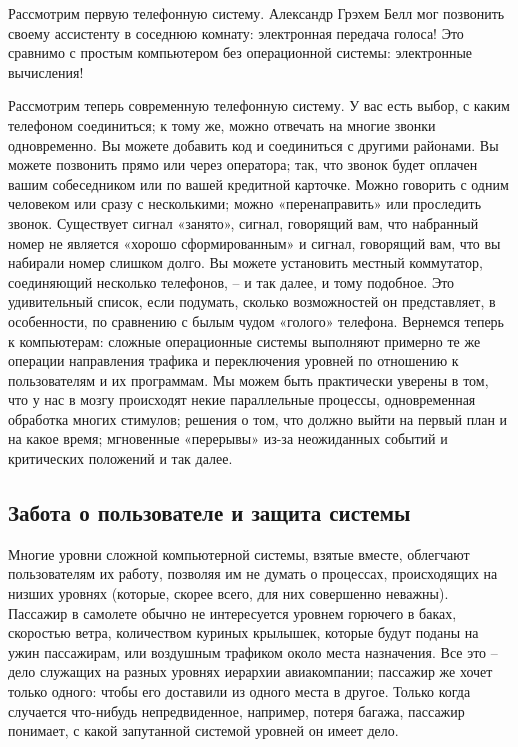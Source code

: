 \documentclass[../main.tex]{subfiles}
\begin{document}
Рассмотрим первую телефонную систему. Александр Грэхем Белл мог позвонить своему ассистенту в соседнюю комнату: электронная передача голоса! Это сравнимо с простым компьютером без операционной системы: электронные вычисления!

Рассмотрим теперь современную телефонную систему. У вас есть выбор, с каким телефоном соединиться; к тому же, можно отвечать на многие звонки одновременно. Вы можете добавить код и соединиться с другими районами. Вы можете позвонить прямо или через оператора; так, что звонок будет оплачен вашим собеседником или по вашей кредитной карточке. Можно говорить с одним человеком или сразу с несколькими; можно «перенаправить» или проследить звонок. Существует сигнал «занято», сигнал, говорящий вам, что набранный номер не является «хорошо сформированным» и сигнал, говорящий вам, что вы набирали номер слишком долго. Вы можете установить местный коммутатор, соединяющий несколько телефонов, \--- и так далее, и тому подобное. Это удивительный список, если подумать, сколько возможностей он представляет, в особенности, по сравнению с былым чудом «голого» телефона. Вернемся теперь к компьютерам: сложные операционные системы выполняют примерно те же операции направления трафика и переключения уровней по отношению к пользователям и их программам. Мы можем быть практически уверены в том, что у нас в мозгу происходят некие параллельные процессы, одновременная обработка многих стимулов; решения о том, что должно выйти на первый план и на какое время; мгновенные «перерывы» из-за неожиданных событий и критических положений и так далее.


\subsection{Забота о пользователе и защита системы}

Многие уровни сложной компьютерной системы, взятые вместе, облегчают пользователям их работу, позволяя им не думать о процессах, происходящих на низших уровнях (которые, скорее всего, для них совершенно неважны). Пассажир в самолете обычно не интересуется уровнем горючего в баках, скоростью ветра, количеством куриных крылышек, которые будут поданы на ужин пассажирам, или воздушным трафиком около места назначения. Все это \--- дело служащих на разных уровнях иерархии авиакомпании; пассажир же хочет только одного: чтобы его доставили из одного места в другое. Только когда случается что-нибудь непредвиденное, например, потеря багажа, пассажир понимает, с какой запутанной системой уровней он имеет дело.
\end{document}
